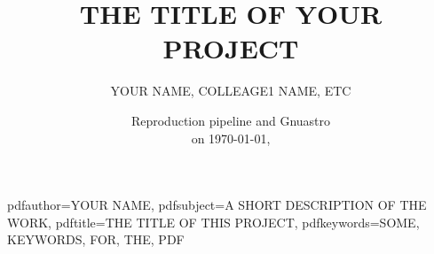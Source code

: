 \usepackage[hang]{footmisc}
\setlength\footnotemargin{10pt}





\usepackage{datetime}





\usepackage[
  colorlinks,
  urlcolor=blue,
  citecolor=blue,
  linkcolor=blue,
  linktocpage]{hyperref}
\renewcommand\UrlFont{\rmfamily}





\hypersetup
{
    pdfauthor={YOUR NAME},
    pdfsubject={A SHORT DESCRIPTION OF THE WORK},
    pdftitle={THE TITLE OF THIS PROJECT},
    pdfkeywords={SOME, KEYWORDS, FOR, THE, PDF}
}





\title{THE TITLE OF YOUR PROJECT}
\author{YOUR NAME, COLLEAGE1 NAME, ETC}
\date{\small Reproduction pipeline \pipelineversion{}
      and Gnuastro \gnuastroversion\\on \today, \currenttime}
